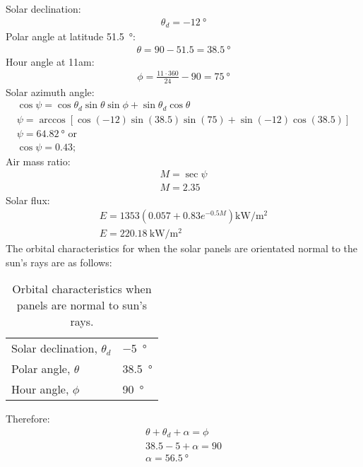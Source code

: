 \documentclass[11pt]{article}
\numberwithin{equation}{section}
\begin{document}
Solar declination:
\begin{gather}
    \theta_d = \SI{-12}{\degree}
\end{gather}
Polar angle at latitude \SI{51.5}{\degree}:
\begin{gather}
    \theta = 90 - 51.5 = \SI{38.5}{\degree}
\end{gather}
Hour angle at 11am:
\begin{gather}
    \phi = \frac{11\cdot 360}{24} -90 = \SI{75}{\degree}
\end{gather}
Solar azimuth angle:
\begin{gather}
    \cos \psi = \cos \theta_d \sin\theta \sin \phi + \sin\theta_d \cos \theta\\
    \psi = \arccos\left[\cos \left(-12\right)\sin\left(38.5\right)\sin\left(75\right) + \sin\left(-12\right)\cos\left(38.5\right)\right]\\
    \psi = \SI{64.82}{\degree} \textrm{ or}\\
    \cos\psi = 0.43;
\end{gather}
Air mass ratio:
\begin{gather}
    M = \sec\psi\\
    M = 2.35
\end{gather}
Solar flux:
\begin{gather}
    E = 1353\left(0.057+0.83e^{-0.5M}\right) \si{\kilo\watt\per\meter\squared}\\
    E = \SI{220.18}{\kilo\watt\per\meter\squared}
\end{gather}
The orbital characteristics for when the solar panels are orientated normal to the sun's rays are as follows:
\begin{table}[H]
    \centering
    \begin{tabular}{@{}ll@{}}
        \toprule
        Solar declination, $\theta_d$ & \SI{-5}{\degree}    \\
        Polar angle, $\theta$         & \SI{38.5}{\degree}  \\
        Hour angle, $\phi$            & \SI{90}{\degree}    \\ 
        \bottomrule
    \end{tabular}
    \caption{Orbital characteristics when panels are normal to sun's rays.}
\end{table}
Therefore:
\begin{gather}
    \theta + \theta_d + \alpha = \phi\\
    38.5 - 5 + \alpha = 90\\
    \alpha = \SI{56.5}{\degree}
\end{gather}
\end{document}
